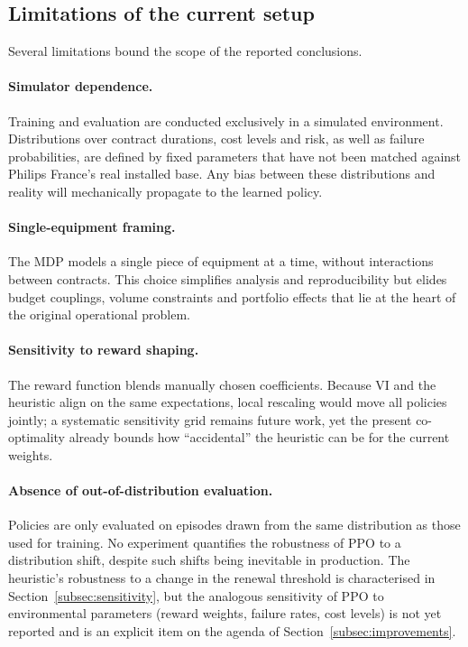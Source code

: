 \subsection{Limitations of the current setup}
\label{subsec:limitations}

Several limitations bound the scope of the reported conclusions.

\paragraph{Simulator dependence.}
Training and evaluation are conducted exclusively in a simulated environment.
Distributions over contract durations, cost levels and risk, as well as
failure probabilities, are defined by fixed parameters that have not been
matched against Philips France's real installed base. Any bias between these
distributions and reality will mechanically propagate to the learned policy.

\paragraph{Single-equipment framing.}
The MDP models a single piece of equipment at a time, without interactions
between contracts. This choice simplifies analysis and reproducibility but
elides budget couplings, volume constraints and portfolio effects that lie
at the heart of the original operational problem.

\paragraph{Sensitivity to reward shaping.}
The reward function blends manually chosen coefficients. Because VI and the
heuristic align on the same expectations, local rescaling would move all
policies jointly; a systematic sensitivity grid remains future work, yet the
present co-optimality already bounds how ``accidental'' the heuristic can be
for the current weights.

\paragraph{Absence of out-of-distribution evaluation.}
Policies are only evaluated on episodes drawn from the same distribution
as those used for training. No experiment quantifies the robustness of
PPO to a distribution shift, despite such shifts being inevitable in
production. The heuristic's robustness to a change in the renewal
threshold is characterised in Section~\ref{subsec:sensitivity}, but the
analogous sensitivity of PPO to environmental parameters (reward
weights, failure rates, cost levels) is not yet reported and is an
explicit item on the agenda of Section~\ref{subsec:improvements}.


